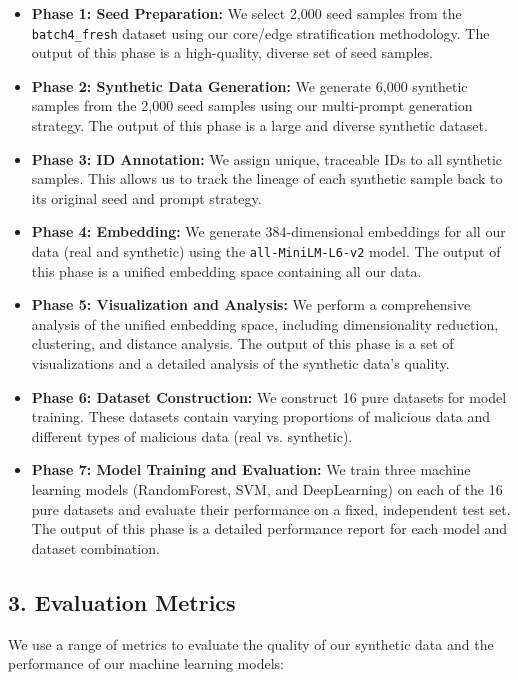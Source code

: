 \documentclass{article}
\begin{document}
\begin{itemize}
    \item \textbf{Phase 1: Seed Preparation:} We select 2,000 seed samples from the \texttt{batch4_fresh} dataset using our core/edge stratification methodology. The output of this phase is a high-quality, diverse set of seed samples.
    \item \textbf{Phase 2: Synthetic Data Generation:} We generate 6,000 synthetic samples from the 2,000 seed samples using our multi-prompt generation strategy. The output of this phase is a large and diverse synthetic dataset.
    \item \textbf{Phase 3: ID Annotation:} We assign unique, traceable IDs to all synthetic samples. This allows us to track the lineage of each synthetic sample back to its original seed and prompt strategy.
    \item \textbf{Phase 4: Embedding:} We generate 384-dimensional embeddings for all our data (real and synthetic) using the \texttt{all-MiniLM-L6-v2} model. The output of this phase is a unified embedding space containing all our data.
    \item \textbf{Phase 5: Visualization and Analysis:} We perform a comprehensive analysis of the unified embedding space, including dimensionality reduction, clustering, and distance analysis. The output of this phase is a set of visualizations and a detailed analysis of the synthetic data's quality.
    \item \textbf{Phase 6: Dataset Construction:} We construct 16 pure datasets for model training. These datasets contain varying proportions of malicious data and different types of malicious data (real vs. synthetic).
    \item \textbf{Phase 7: Model Training and Evaluation:} We train three machine learning models (RandomForest, SVM, and DeepLearning) on each of the 16 pure datasets and evaluate their performance on a fixed, independent test set. The output of this phase is a detailed performance report for each model and dataset combination.
\end{itemize}

\subsection*{3. Evaluation Metrics}

We use a range of metrics to evaluate the quality of our synthetic data and the performance of our machine learning models:
\end{document}
